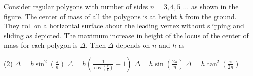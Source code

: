 
    \item Consider regular polygons with number of sides \( n = 3, 4, 5, \ldots \) as shown in the figure. The center of mass of all the polygons is at height \( h \) from the ground. They roll on a horizontal surface about the leading vertex without slipping and sliding as depicted. The maximum increase in height of the locus of the center of mass for each polygon is \( \Delta \). Then \( \Delta \) depends on \( n \) and \( h \) as
        \begin{tasks}(2)
            \task \( \Delta = h \sin^2\left(\frac{\pi}{n}\right) \)
            \task \( \Delta = h \left( \frac{1}{\cos\left(\frac{\pi}{n}\right)} - 1 \right) \)
            \task \( \Delta = h \sin \left(\frac{2\pi}{n}\right) \)
            \task \( \Delta = h \tan^2\left(\frac{\pi}{2n}\right) \)
        \end{tasks}


\begin{center}
\end{center}